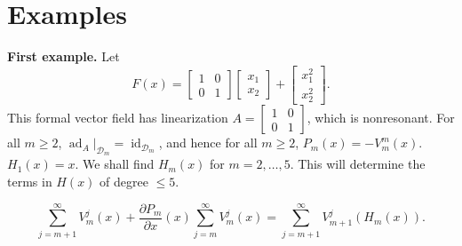\documentclass{article}
\theoremstyle{definition}
\newcommand{\ad}{\operatorname{ad}}
\newcommand{\id}{\operatorname{id}}
\begin{document}
\section{Examples}
\label{examples}
\textbf{First example.} Let 
\[
F(x)=\begin{bmatrix}1&0\\0&1\end{bmatrix}\begin{bmatrix}x_1\\x_2\end{bmatrix}
+\begin{bmatrix}x_1^2\\x_2^2\end{bmatrix}. 
\]
This formal vector field has linearization
$A=\begin{bmatrix}1&0\\0&1\end{bmatrix}$, which is nonresonant. For all $m \geq 2$, $\ad_A|_{\mathscr{D}_m}=\id_{\mathscr{D}_m}$, and hence for all $m \geq 2$, $P_m(x)=-V_m^m(x)$.
$H_1(x)=x$. We shall find $H_m(x)$ for $m=2,\ldots,5$. This will determine the terms in $H(x)$
of degree $\leq 5$.

\begin{equation}
\label{determinedby}
\sum_{j=m+1}^\infty V^j_m(x)
+
\frac{\partial P_m}{\partial x}(x)
\sum_{j=m}^\infty V^j_m(x)
=\sum_{j=m+1}^\infty V_{m+1}^j(H_m(x)).
\end{equation}
\end{document}
